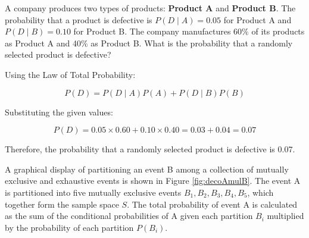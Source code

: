 \begin{example}
    A company produces two types of products: \textbf{Product A} and \textbf{Product B}. The probability that a product is defective is \( P(D \mid A) = 0.05 \) for Product A and \( P(D \mid B) = 0.10 \) for Product B. The company manufactures 60\% of its products as Product A and 40\% as Product B. What is the probability that a randomly selected product is defective?
\end{example}

\begin{solution}
    Using the Law of Total Probability:

    \[
    P(D) = P(D \mid A) P(A) + P(D \mid B) P(B)
    \]

    Substituting the given values:

    \[
    P(D) = 0.05 \times 0.60 + 0.10 \times 0.40 = 0.03 + 0.04 = 0.07
    \]

    Therefore, the probability that a randomly selected product is defective is 0.07.
\end{solution}

A graphical display of partitioning an event B
among a collection of mutually exclusive and exhaustive events is shown in Figure \ref{fig:decoAmulB}. The event A is partitioned into five mutually exclusive events \( B_1, B_2, B_3, B_4, B_5 \), which together form the sample space \( S \). The total probability of event A is calculated as the sum of the conditional probabilities of A given each partition \( B_i \) multiplied by the probability of each partition \( P(B_i) \).

